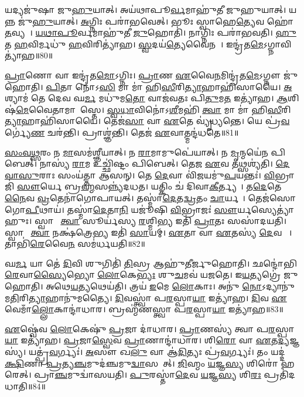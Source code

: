 𑌯𑌦𑍍𑌯𑌜𑍁॑𑌷𑌾 𑌜𑍁\ul{𑌹𑍁}𑌯𑌾𑌤𑍍। 
𑌅𑌯॑𑌥𑌾𑌪𑍂\ul{𑌰𑍍𑌵}𑌮𑌾𑌹𑍁॑𑌤𑍀 𑌜𑍁𑌹𑍁𑌯𑌾𑌤𑍍। 
𑌯𑌨𑍍𑌨 𑌜𑍁॑\ul{𑌹𑍁}𑌯𑌾𑌤𑍍। 
\ul{𑌅}𑌗𑍍𑌨𑌿𑌃 𑌪𑌰𑌾॑𑌭𑌵𑍇𑌤𑍍। 
𑌭𑍂𑌃 𑌸𑍍𑌵𑌾𑌹𑍇\ul{𑌤𑍍𑌯𑍇}𑌵 𑌹𑍋॑\ul{𑌤}𑌵𑍍𑌯𑌮𑍍᳚। 
\ul{𑌯}\ul{𑌥𑌾}\ul{𑌪𑍂}𑌰𑍍𑌵𑌮𑌾𑌹𑍁॑𑌤𑍀 \ul{𑌜𑍁}𑌹𑍋𑌤𑌿॑। 
𑌨𑌾𑌗𑍍𑌨𑌿𑌃 𑌪𑌰𑌾॑𑌭𑌵𑌤𑌿। 
\ul{𑌹𑍁}𑌤 \ul{𑌹}𑌵𑌿𑌰𑍍𑌮𑌧𑍁॑ \ul{𑌹}𑌵𑌿𑌰𑌿𑌤𑍍𑌯𑌾॑𑌹। 
\ul{𑌸𑍍𑌵}𑌦𑌯॑\ul{𑌤𑍍𑌯𑍇}𑌵𑍈𑌨𑌮𑍍᳚। 
𑌇𑌨𑍍𑌦𑍍𑌰॑𑌤\ul{𑌮𑍇}𑌽𑌗𑍍𑌨𑌾𑌵𑌿𑌤𑍍𑌯𑌾॑𑌹॥80॥

\ul{𑌪𑍍𑌰𑌾}𑌣𑍋 𑌵𑌾 𑌇𑌨𑍍𑌦𑍍𑌰॑𑌤\ul{𑌮𑍋}𑌽𑌗𑍍𑌨𑌿𑌃। 
\ul{𑌪𑍍𑌰𑌾}𑌣 \ul{𑌏}𑌵𑍈\ul{𑌨}𑌮𑌿𑌨𑍍𑌦𑍍𑌰॑𑌤\ul{𑌮𑍇}𑌽𑌗𑍍𑌨𑍗 𑌜𑍁॑𑌹𑍋𑌤𑌿। 
\ul{𑌪𑌿}𑌤𑌾 𑌨𑍋॑𑌽\ul{𑌸𑌿} 𑌮𑌾 𑌮𑌾॑ 𑌹𑌿\ul{𑌸𑍀}𑌰𑌿\ul{𑌤𑍍𑌯𑌾}𑌹𑌾𑌹𑌿॑𑌸𑌾𑌯𑍈। 
\ul{𑌅}𑌶𑍍𑌯𑌾𑌮॑ 𑌤𑍇 𑌦𑍇𑌵 𑌘\ul{𑌰𑍍𑌮} 𑌮𑌧𑍁॑𑌮\ul{𑌤𑍋} 𑌵𑌾𑌜॑𑌵𑌤𑌃 𑌪𑌿\ul{𑌤𑍁}𑌮\ul{𑌤} 𑌇𑌤𑍍𑌯𑌾॑𑌹। 
\ul{𑌆}𑌶𑌿𑌷॑\ul{𑌮𑍇}𑌵𑍈𑌤𑌾𑌮𑌾𑌶𑌾᳚𑌸𑍍𑌤𑍇। 
\ul{𑌸𑍍𑌵}\ul{𑌧𑌾}𑌵𑌿𑌨𑍋॑𑌽\ul{𑌶𑍀}𑌮𑌹𑌿॑ \ul{𑌤𑍍𑌵𑌾} 𑌮𑌾 𑌮𑌾॑ 𑌹𑌿\ul{𑌸𑍀}𑌰𑌿\ul{𑌤𑍍𑌯𑌾}𑌹𑌾𑌹𑌿॑𑌸𑌾𑌯𑍈। 
𑌤𑍇𑌜॑\ul{𑌸𑌾} 𑌵𑌾 \ul{𑌏}𑌤𑍇 𑌵𑍍𑌯𑍃॑𑌧𑍍𑌯𑌨𑍍𑌤𑍇। 
𑌯𑍇 𑌪𑍍𑌰॑\ul{𑌵}𑌰𑍍𑌗𑍍𑌯𑍇॑\ul{𑌣} 𑌚𑌰॑𑌨𑍍𑌤𑌿। 
𑌪𑍍𑌰𑌾𑌶𑍍𑌞॑𑌨𑍍𑌤𑌿। 
𑌤𑍇𑌜॑ \ul{𑌏}𑌵𑌾𑌤𑍍𑌮𑌨𑍍𑌦॑𑌧𑌤𑍇॥81॥

\ul{𑌸𑌂}\ul{𑌵}\ul{𑌥𑍍𑌸}𑌰𑌂 𑌨 \ul{𑌮𑌾}\ul{}𑌸𑌮॑𑌶𑍍𑌞𑍀𑌯𑌾𑌤𑍍। 
𑌨 \ul{𑌰𑌾}𑌮𑌾𑌮𑍁𑌪𑍇॑𑌯𑌾𑌤𑍍। 
𑌨 \ul{𑌮𑍃}𑌨𑍍𑌮𑌯𑍇॑𑌨 𑌪𑌿𑌬𑍇𑌤𑍍। 
𑌨𑌾𑌸𑍍𑌯॑ \ul{𑌰𑌾}𑌮 𑌉𑌚𑍍𑌛𑌿॑𑌷𑍍𑌟𑌂 𑌪𑌿𑌬𑍇𑌤𑍍। 
𑌤𑍇𑌜 \ul{𑌏}𑌵 𑌤𑌥𑍍𑌸𑌶𑍍𑌯॑𑌤𑌿। 
\ul{𑌦𑍇}\ul{𑌵𑌾}\ul{𑌸𑍁}𑌰𑌾𑌃 𑌸𑌂𑌯॑𑌤𑍍𑌤𑌾 𑌆𑌸𑌨𑍍। 
𑌤𑍇 \ul{𑌦𑍇}𑌵𑌾 𑌵𑌿॑\ul{𑌜}𑌯𑌮𑍁॑\ul{𑌪}𑌯𑌨𑍍𑌤𑌃॑। 
\ul{𑌵𑌿}𑌭𑍍𑌰𑌾𑌜𑌿॑ \ul{𑌸𑍗}𑌰𑍍𑌯𑍇 𑌬𑍍𑌰\ul{𑌹𑍍𑌮}𑌸𑌨𑍍𑌨𑍍𑌯॑𑌦𑌧𑌤। 
𑌯𑌤𑍍𑌕𑌿𑌂 𑌚॑ 𑌦𑌿𑌵𑌾\ul{𑌕𑍀}𑌰𑍍𑌤𑍍𑌯𑌮𑍍᳚। 
𑌤\ul{𑌦𑍇}𑌤𑍇\ul{𑌨𑍈}𑌵 \ul{𑌵𑍍𑌰}𑌤𑍇𑌨𑌾॑𑌗𑍋𑌪𑌾𑌯𑌤𑍍। 
𑌤𑌸𑍍𑌮𑌾॑\ul{𑌦𑍇}𑌤\ul{𑌦𑍍𑌵𑍍𑌰}𑌤𑌂 \ul{𑌚𑌾}𑌰𑍍𑌯𑌮𑍍᳚। 
𑌤𑍇𑌜॑𑌸𑍋 𑌗𑍋\ul{𑌪𑍀}𑌥𑌾𑌯॑। 
𑌤𑌸𑍍𑌮𑌾॑\ul{𑌦𑍇}𑌤𑌾\ul{𑌨𑌿} 𑌯𑌜𑍂॑𑌷𑌿 \ul{𑌵𑌿}𑌭𑍍𑌰𑌾𑌜𑌃॑ \ul{𑌸𑍗}𑌰𑍍𑌯𑌸𑍍𑌯𑍇𑌤𑍍𑌯𑌾॑𑌹𑍁𑌃। 
𑌸𑍍𑌵𑌾𑌹𑌾᳚ \ul{𑌤𑍍𑌵𑌾} 𑌸𑍂𑌰𑍍𑌯॑𑌸𑍍𑌯 \ul{𑌰}𑌶𑍍𑌮𑌿\ul{𑌭𑍍𑌯} 𑌇𑌤𑌿॑ \ul{𑌪𑍍𑌰𑌾}𑌤𑌃 𑌸𑌸𑌾॑𑌦𑌯𑌤𑌿। 
𑌸𑍍𑌵𑌾𑌹𑌾᳚ \ul{𑌤𑍍𑌵𑌾} 𑌨𑌕𑍍𑌷॑𑌤𑍍𑌰𑍇\ul{𑌭𑍍𑌯} 𑌇𑌤𑌿॑ \ul{𑌸𑌾}𑌯𑌮𑍍। 
\ul{𑌏}𑌤𑌾 𑌵𑌾 \ul{𑌏}𑌤𑌸𑍍𑌯॑ \ul{𑌦𑍇}𑌵𑌤𑌾𑌃᳚। 
𑌤𑌾𑌭𑌿॑\ul{𑌰𑍇}𑌵𑍈\ul{𑌨}\ul{} 𑌸𑌮॑𑌰𑍍𑌧𑌯𑌤𑌿॥82॥

𑌘\ul{𑌰𑍍𑌮} 𑌯𑌾 𑌤𑍇॑ \ul{𑌦𑌿}𑌵𑌿 𑌶𑍁𑌗𑌿𑌤𑌿॑ \ul{𑌤𑌿}𑌸𑍍𑌰 𑌆𑌹𑍁॑𑌤𑍀𑌰𑍍𑌜𑍁𑌹𑍋𑌤𑌿। 
𑌛𑌨𑍍𑌦𑍋॑𑌭𑌿\ul{𑌰𑍇}𑌵𑌾\ul{𑌸𑍍𑌯𑍈}𑌭𑍍𑌯𑍋 \ul{𑌲𑍋}𑌕𑍇\ul{𑌭𑍍𑌯𑌃} 𑌶𑍁\ul{𑌚}𑌮𑌵॑ 𑌯𑌜𑌤𑍇। 
𑌇\ul{𑌯}𑌤𑍍𑌯𑌗𑍍𑌰𑍇॑ 𑌜𑍁𑌹𑍋𑌤𑌿। 
𑌅𑌥𑍇\ul{𑌯}𑌤𑍍𑌯𑌥𑍇𑌯॑𑌤𑌿। 
𑌤𑍍𑌰𑌯॑ \ul{𑌇}𑌮𑍇 \ul{𑌲𑍋}𑌕𑌾𑌃। 
𑌅𑌨𑍁॑ \ul{𑌨𑍋}𑌽𑌦𑍍𑌯𑌾𑌨𑍁॑\-𑌮\ul{𑌤𑌿}𑌰𑌿\ul{𑌤𑍍𑌯𑌾}𑌹𑌾𑌨𑍁॑𑌮𑌤𑍍𑌯𑍈। 
\ul{𑌦𑌿}𑌵𑌸𑍍𑌤𑍍𑌵𑌾॑ 𑌪\ul{𑌰}𑌸𑍍𑌪𑌾\ul{𑌯𑌾} 𑌇𑌤𑍍𑌯𑌾॑𑌹। 
\ul{𑌦𑌿}𑌵 \ul{𑌏}𑌵𑍇𑌮𑌾𑌁\ul{𑌲𑍍𑌲𑍋}𑌕𑌾𑌨𑍍𑌦𑌾॑𑌧𑌾𑌰। 
𑌬𑍍𑌰𑌹𑍍𑌮॑𑌣𑌸𑍍𑌤𑍍𑌵𑌾 𑌪\ul{𑌰}𑌸𑍍𑌪𑌾\ul{𑌯𑌾} 𑌇𑌤𑍍𑌯𑌾॑𑌹॥83॥

\ul{𑌏}𑌷𑍍𑌵𑍇॑𑌵 \ul{𑌲𑍋}𑌕𑍇𑌷𑍁॑ \ul{𑌪𑍍𑌰}𑌜𑌾 𑌦𑌾॑𑌧𑌾𑌰। 
\ul{𑌪𑍍𑌰𑌾}𑌣𑌸𑍍𑌯॑ 𑌤𑍍𑌵𑌾 𑌪\ul{𑌰}𑌸𑍍𑌪𑌾\ul{𑌯𑌾} 𑌇𑌤𑍍𑌯𑌾॑𑌹। 
\ul{𑌪𑍍𑌰}𑌜𑌾\ul{𑌸𑍍𑌵𑍇}𑌵 \ul{𑌪𑍍𑌰𑌾}𑌣𑌾𑌨𑍍𑌦𑌾॑𑌧𑌾𑌰। 
𑌶𑌿\ul{𑌰𑍋} 𑌵𑌾 \ul{𑌏}𑌤\ul{𑌦𑍍𑌯}𑌜𑍍𑌞𑌸𑍍𑌯॑। 
𑌯𑌤𑍍𑌪𑍍𑌰॑\ul{𑌵}𑌰𑍍𑌗𑍍𑌯𑌃॑। 
\ul{𑌅}𑌸𑍗 𑌖\ul{𑌲𑍁} 𑌵𑌾 𑌆॑\ul{𑌦𑌿}𑌤𑍍𑌯𑌃 𑌪𑍍𑌰॑\ul{𑌵}𑌰𑍍𑌗𑍍𑌯𑌃॑। 
𑌤𑌂 𑌯𑌦𑍍𑌦॑\ul{𑌕𑍍𑌷𑌿}𑌣𑌾 \ul{𑌪𑍍𑌰}𑌤𑍍𑌯\ul{𑌞𑍍𑌚}𑌮𑍁𑌦॑𑌞𑍍𑌚𑌮𑍁\ul{𑌦𑍍𑌵𑌾}𑌸𑌯𑍇᳚𑌤𑍍। 
\ul{𑌜𑌿}𑌹𑍍𑌮𑌂 \ul{𑌯}𑌜𑍍𑌞\ul{𑌸𑍍𑌯} 𑌶𑌿𑌰𑍋॑ 𑌹𑌰𑍇𑌤𑍍। 
𑌪𑍍𑌰𑌾\ul{𑌞𑍍𑌚}𑌮𑍁𑌦𑍍𑌵𑌾॑𑌸𑌯𑌤𑌿। 
\ul{𑌪𑍁}𑌰𑌸𑍍𑌤𑌾॑\ul{𑌦𑍇}𑌵 \ul{𑌯}𑌜𑍍𑌞\ul{𑌸𑍍𑌯} 𑌶𑌿\ul{𑌰𑌃} 𑌪𑍍𑌰𑌤𑌿॑𑌦𑌧𑌾𑌤𑌿॥84॥

